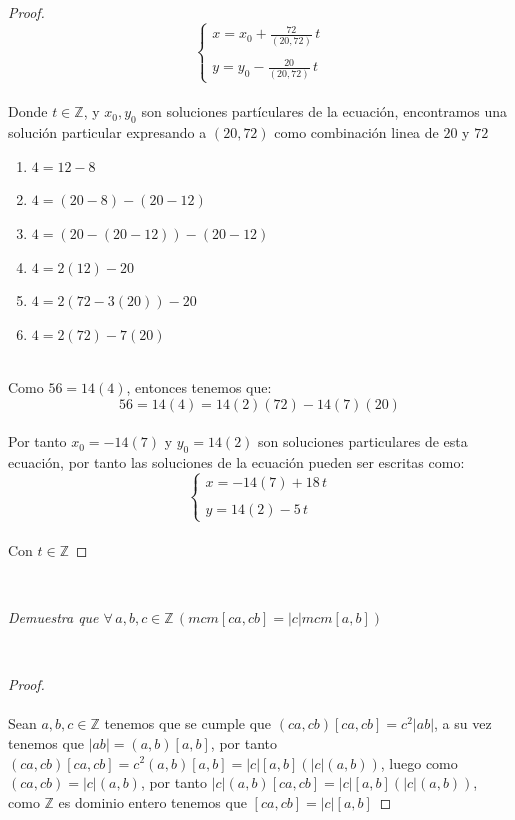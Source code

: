 \documentclass[11pt,letterpaper]{article}
\newcommand{\Z}{\mathbb{Z}}
\begin{document}
\begin{proof}
     \begin{equation*}
        \left\{ \begin{array}{lcc} x=x_0+\frac{72}{(20,72)}\,t\\ \\ y=y_0-\frac{20}{(20,72)}\,t \end{array} \right.
     \end{equation*}\,\\
     Donde $t\in \Z$, y $x_0,y_0$ son soluciones part\'iculares de la ecuaci\'on, encontramos una soluci\'on particular expresando
     a $(20,72)$ como combinaci\'on linea de $20$ y $72$\,\\
     \begin{enumerate}
        \item $4=12-8$
        \item $4=(20-8)-(20-12)$
        \item $4=(20-(20-12))-(20-12)$
        \item $4=2(12)-20$
        \item $4=2(72-3(20))-20$
        \item $4=2(72)-7(20)$
     \end{enumerate}\,\\
     Como $56=14(4)$, entonces tenemos que:\,\\
     \begin{equation*}
        56=14(4)=14(2)(72)-14(7)(20)
     \end{equation*}\,\\
     Por tanto $x_0=-14(7)$ y $y_0=14(2)$ son soluciones particulares de esta ecuaci\'on, por tanto
     las soluciones de la ecuaci\'on pueden ser escritas como:\,\\
     \begin{equation*}
        \left\{ \begin{array}{lcc} x=-14(7)+18\,t\\ \\ y=14(2)-5\,t \end{array} \right.
     \end{equation*}\,\\
Con $t\in \Z$
\end{proof}
\,\\
\begin{tcolorbox}[
	title = \textcolor{black}{\textcolor{white}{Problema 9}},]
\textit{
Demuestra que $\forall\,a,b,c\in \Z\,(mcm[ca,cb]=|c|mcm[a,b])$
}
\end{tcolorbox}\,\\
\begin{proof}\,\\
    \,\\
    Sean $a,b,c \in \Z$ tenemos que se cumple que $(ca,cb)[ca,cb]=c^2|ab|$,  a su vez tenemos que
    $|ab|=(a,b)[a,b]$, por tanto $(ca,cb)[ca,cb]=c^2(a,b)[a,b]=|c|[a,b](|c|(a,b))$, luego
    como $(ca,cb)=|c|(a,b)$, por tanto $|c|(a,b)[ca,cb]=|c|[a,b](|c|(a,b))$, como $\Z$ es dominio entero tenemos que
    $[ca,cb]=|c|[a,b]$
    
\end{proof}\,\\
\end{document}
